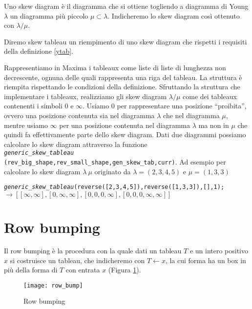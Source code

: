 \begin{defn}
Uno skew diagram \`e il diagramma che si ottiene togliendo a
diagramma di Young $\lambda$ un diagramma pi\`u piccolo $\mu \subset
\lambda$. Indicheremo lo skew diagram cos\`i ottenuto con $\lambda / \mu$.
\end{defn} 

\begin{defn}
Diremo skew tableau un riempimento di uno skew diagram che rispetti i
requisiti della definizione \ref{ytab}. 
\end{defn}

Rappresentiamo in Maxima i tableaux come liste di liste di lunghezza
non decrescente, ognuna delle quali rappresenta una riga del tableau.
La struttura \`e riempita rispettando le condizioni della definizione.
Sfruttando la struttura che implementare i tableaux, realizziamo gli
skew diagram $\lambda/\mu$ come dei tableaux contenenti i simboli $0$ e $\infty$.
Usiamo $0$ per rappresentare una posizione ``proibita'', ovvero una
posizione contenuta sia nel diagramma $\lambda$ che nel diagramma
$\mu$, mentre usiamo $\infty$ per una posizione contenuta nel
diagramma $\lambda$ ma non in $\mu$ che quindi fa effettivamente parte
dello skew diagram. Dati due diagrammi possiamo calcolare lo skew
diagram attraverso la funzione\\
\texttt{\emph{generic\_skew\_tableau} (rev\_big\_shape,rev\_small\_shape,gen\_skew\_tab,curr)}.
Ad esempio per calcolare lo skew diagram $\lambda \ \mu$ originato da
$\lambda=(2,3,4,5)$ e $\mu=(1,3,3)$

\begin{alltt}
\emph{generic\_skew\_tableau} (reverse ([2,3,4,5]),reverse ([1,3,3]),[],1);
\(\rightarrow [[\infty,\infty],[0,\infty,\infty],[0,0,0,\infty],[0,0,0,\infty,\infty]]\)
\end{alltt}

\section{Row bumping}\label{rowbump_par}
Il row bumping \`e la procedura con la quale dati un tableau $T$ e un
intero positivo $x$ si costruisce un tableau, che indicheremo con $T
\gets x$, la cui forma ha un box in pi\`u della forma di $T$ con
entrata $x$ (Figura \ref{fig:rowbump}).

\begin{figure}[h]
\centering
\texttt{[image: row\_bump]}
\caption{Row bumping}
\label{fig:rowbump}
\end{figure}

